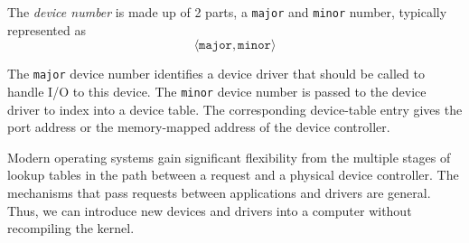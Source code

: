 \begin{definition}\label{def:Device_Number}
  The \emph{device number} is made up of 2 parts, a \texttt{major} and \texttt{minor} number, typically represented as
  \begin{equation*}
    \langle \mathtt{major}, \mathtt{minor} \rangle
  \end{equation*}

  The \texttt{major} device number identifies a device driver that should be called to handle I/O to this device.
  The \texttt{minor} device number  is passed to the device driver to index into a device table.
  The corresponding device-table entry gives the port address or the memory-mapped address of the device controller.
\end{definition}

Modern operating systems gain significant flexibility from the multiple stages of lookup tables in the path between a request and a physical device controller.
The mechanisms that pass requests between applications and drivers are general.
Thus, we can introduce new devices and drivers into a computer without recompiling the kernel.

